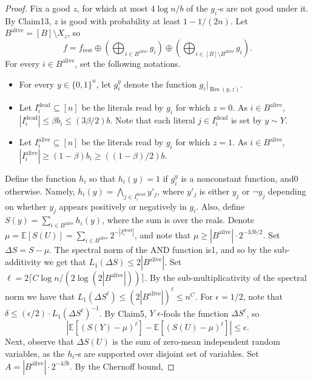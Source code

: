\begin{proof}
Fix a good $z$, for which at most $4\log n/b$ of the $g_i$-s are not good under it. By Claim13, $z$ is good with probability at least $1-1/(2n)$. Let $B^{\mathrm{alive}}=[B]\setminus X_z$, so
\[
f=f_{\mathrm{rest}}\oplus\left(\bigoplus_{i\in B^{\mathrm{alive}}}g_i\right)\oplus\left(\bigoplus_{i\in[B]\setminus B^{\mathrm{alive}}}g_i\right).
\]
For every $i\in B^{\mathrm{alive}}$, set the following notations.
\begin{itemize}
\item For every $y\in\{0,1\}^n$, let $g_i^y$ denote the function $g_i|_{\operatorname{Res}(y,z)}$.
\item Let $I_i^{\mathrm{dead}}\subseteq[n]$ be the literals read by $g_i$ for which $z=0$. As $i\in B^{\mathrm{alive}}$, $|I_i^{\mathrm{dead}}|\le\beta b_i\le(3\beta/2)b$. Note that each literal $j\in I_i^{\mathrm{dead}}$ is set by $y\sim Y$.
\item Let $I_i^{\mathrm{alive}}\subseteq[n]$ be the literals read by $g_i$ for which $z=1$. As $i\in B^{\mathrm{alive}}$, $|I_i^{\mathrm{alive}}|\ge(1-\beta)b_i\ge((1-\beta)/2)b$.
\end{itemize}
Define the function $h_i$ so that $h_i(y)=1$ if $g_i^y$ is a nonconstant function, and0 otherwise. Namely, $h_i(y)=\bigwedge_{j\in I_i^{\mathrm{dead}}}y'_j$, where $y'_j$ is either $y_j$ or $\neg y_j$ depending on whether $y_j$ appears positively or negatively in $g_i$. Also, define $S(y)=\sum_{i\in B^{\mathrm{alive}}}h_i(y)$, where the sum is over the reals. Denote $\mu=\mathbb E[S(U)]=\sum_{i\in B^{\mathrm{alive}}}2^{-|I_i^{\mathrm{dead}}|}$, and note that $\mu\ge|B^{\mathrm{alive}}|\cdot2^{-3\beta b/2}$.
Set $\Delta S=S-\mu$. The spectral norm of the AND function is1, and so by the sub-additivity we get that $L_1(\Delta S)\le2|B^{\mathrm{alive}}|$. Set $\ell=2\lceil C\log n/(2\log(2|B^{\mathrm{alive}}|))\rceil$. By the sub-multiplicativity of the spectral norm we have that $L_1(\Delta S^\ell)\le(2|B^{\mathrm{alive}}|)^\ell\le n^C$.
For $\epsilon=1/2$, note that $\delta\le(\epsilon/2)\cdot L_1(\Delta S^\ell)^{-1}$. By Claim5, $Y$ $\epsilon$-fools the function $\Delta S^\ell$, so
\begin{equation}
|\mathbb E[(S(Y)-\mu)^\ell]-\mathbb E[(S(U)-\mu)^\ell]|\le\epsilon.\tag{5}
\end{equation}
Next, observe that $\Delta S(U)$ is the sum of zero-mean independent random variables, as the $h_i$-s are supported over disjoint set of variables. Set $A=|B^{\mathrm{alive}}|\cdot2^{-4\beta b}$. By the Chernoff bound,

\end{proof}

